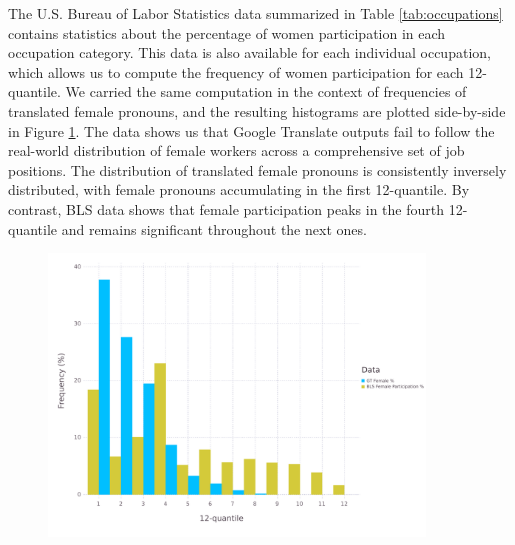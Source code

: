 \documentclass[fleqn,10pt]{article}
\begin{document}
The U.S. Bureau of Labor Statistics data summarized in Table \ref{tab:occupations} contains statistics about the percentage of women participation in each occupation category. This data is also available for each individual occupation, which allows us to compute the frequency of women participation for each 12-quantile. We carried the same computation in the context of frequencies of translated female pronouns, and the resulting histograms are plotted side-by-side in Figure \ref{fig:histogram-compare-gt-real}. The data shows us that Google Translate outputs fail to follow the real-world distribution of female workers across a comprehensive set of job positions. The distribution of translated female pronouns is consistently inversely distributed, with female pronouns accumulating in the first 12-quantile. By contrast, BLS data shows that female participation peaks in the fourth 12-quantile and remains significant throughout the next ones.

\begin{figure}[H]
	\centering
	\includegraphics[width=10cm]{pictures/histogram-compare-gt-real}
	\caption{}
	\label{fig:histogram-compare-gt-real}
\end{figure}
\end{document}
